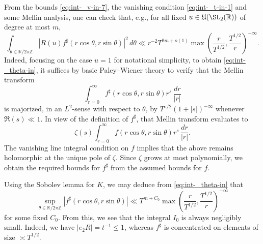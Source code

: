 From the bounds \eqref{eq:int-_v-in-7}, the vanishing condition \eqref{eq:int-_t-in-1} and some Mellin analysis, one can check that, e.g., for all fixed $u \in \mathfrak{U}(\SL_2(\mathbb{R}))$ of degree at most $m$,
\begin{equation}\label{eq:int-_theta-in}
  \int_{\theta \in \mathbb{R} / 2 \pi \mathbb{Z} }
  \left\lvert R(u) f^\sharp  (r \cos \theta, r \sin \theta ) \right\rvert^2
  \, d \theta
  \ll r^{-2} T^{2 m + o(1)} \max \left( \frac{r}{T^{1/2}}, \frac{T^{1/2}}{r} \right)^{-\infty}.
\end{equation}
Indeed, focusing on the case $u=1$ for notational simplicity, to obtain \eqref{eq:int-_theta-in}, it suffices by basic Paley--Wiener theory to verify that the Mellin transform
\begin{equation*}
  \int_{r =0}^{\infty}
  f^\sharp (r \cos \theta, r \sin \theta )
  r^s \, \frac{d r}{|r|}
\end{equation*}
is majorized, in an $L^2$-sense with respect to $\theta$, by $T^{s/2}(1 + |s|)^{-\infty}$ whenever $\Re(s) \ll 1$.  In view of the definition of $f^\sharp$, that Mellin transform evaluates to
\begin{equation*}
  \zeta(s)
  \int_{r =0}^{\infty}
  f  (r \cos \theta, r \sin \theta )
  r^s \, \frac{d r}{|r|}.
\end{equation*}
The vanishing line integral condition on $f$ implies that the above remains holomorphic at the unique pole of $\zeta$.  Since $\zeta$ grows at most polynomially, we obtain the required bounds for $f^\sharp $ from the assumed bounds for $f$.

Using the Sobolev lemma for $K$, we may deduce from \eqref{eq:int-_theta-in} that
\begin{equation*}
  \sup_{\theta \in \mathbb{R} / 2 \pi \mathbb{Z} }
  \left\lvert f^\sharp  (r \cos \theta, r \sin \theta ) \right\rvert
  \ll T^{m + C_0} \max \left( \frac{r}{T^{1/2}}, \frac{T^{1/2}}{r} \right)^{-\infty}
\end{equation*}
for some fixed $C_0$.  From this, we see that the integral $I_0$ is always negligibly small.  Indeed, we have $\left\lvert e_2 R \right\rvert = t^{-1} \leq 1$, whereas $f^\sharp $ is concentrated on elements of size $\asymp T^{1/2}$.

